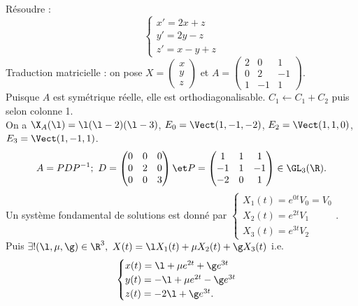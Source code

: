 \documentclass[11pt]{article}
\begin{document}
\begin{exercice}{}{}
    Résoudre :
    \begin{equation*}
        \begin{cases}
            x' = 2x + z \\ y' = 2y - z \\ z' = x - y + z
        \end{cases}
    \end{equation*}
    \tcblower
    Traduction matricielle : on pose $X=\begin{pmatrix}x\\y\\z\end{pmatrix}$ et $A=\begin{pmatrix}2 & 0 & 1 \\ 0 & 2 & -1 \\ 1 & -1 & 1\end{pmatrix}$.\\
    Puisque $A$ est symétrique réelle, elle est orthodiagonalisable. $C_1\gets C_1 + C_2$ puis selon colonne 1.\\
    On a $\X_A(\l) = \l(\l-2)(\l-3)$, $E_0 = \Vect(1,-1,-2)$, $E_2 = \Vect(1,1,0)$, $E_3=\Vect(1,-1,1)$.
    \begin{equation*}
        A=PDP^{-1}; ~ D=\begin{pmatrix}0&0&0\\0&2&0\\0&0&3\end{pmatrix} \et P=\begin{pmatrix}1&1&1\\-1&1&-1\\-2&0&1\end{pmatrix}\in\GL_3(\R).
    \end{equation*}
    Un système fondamental de solutions est donné par $\begin{cases}X_1(t)=e^{0t}V_0 = V_0 \\ X_2(t)=e^{2t}V_1 \\ X_3(t)=e^{3t}V_2\end{cases}$.\\
    Puis $\exists!(\l,\mu,\g)\in\R^3, ~ X(t)=\l X_1(t)+\mu X_2(t) + \g X_3(t)$ i.e. 
    \begin{equation*}
        \begin{cases}
            x(t) = \l + \mu e^{2t} + \g e^{3t} \\ y(t) = -\l + \mu e^{2t} - \g e^{3t} \\ z(t) = -2\l + \g e^{3t}.
        \end{cases}
    \end{equation*}
\end{exercice}
\end{document}
